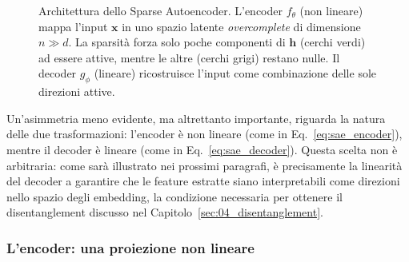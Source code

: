 \begin{figure}[htbp]
    \caption{Architettura dello Sparse Autoencoder. L'encoder $f_\theta$ (non lineare) mappa l'input $\mathbf{x}$ in uno spazio latente \textit{overcomplete} di dimensione $n \gg d$. La sparsità forza solo poche componenti di $\mathbf{h}$ (cerchi verdi) ad essere attive, mentre le altre (cerchi grigi) restano nulle. Il decoder $g_\phi$ (lineare) ricostruisce l'input come combinazione delle sole direzioni attive.}
    \label{fig:sae_architecture}
\end{figure}
Un'asimmetria meno evidente, ma altrettanto importante, riguarda la natura delle due trasformazioni: l'encoder è non lineare (come in Eq.~\ref{eq:sae_encoder}), mentre il decoder è lineare (come in Eq.~\ref{eq:sae_decoder}). Questa scelta non è arbitraria: come sarà illustrato nei prossimi paragrafi, è precisamente la linearità del decoder a garantire che le feature estratte siano interpretabili come direzioni nello spazio degli embedding, la condizione necessaria per ottenere il disentanglement discusso nel Capitolo~\ref{sec:04_disentanglement}.
\subsubsection{L'encoder: una proiezione non lineare}
\label{subsubsec:sae_encoder}

